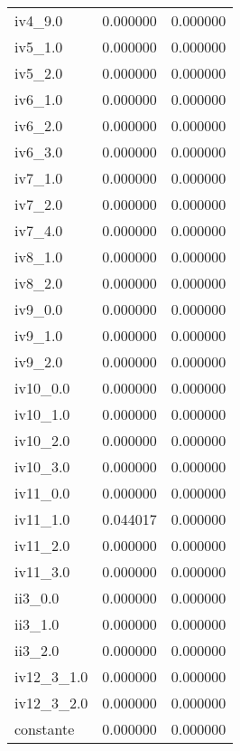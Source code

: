 \begin{tabular}{lrr}
iv4_9.0 & 0.000000 & 0.000000 \\
iv5_1.0 & 0.000000 & 0.000000 \\
iv5_2.0 & 0.000000 & 0.000000 \\
iv6_1.0 & 0.000000 & 0.000000 \\
iv6_2.0 & 0.000000 & 0.000000 \\
iv6_3.0 & 0.000000 & 0.000000 \\
iv7_1.0 & 0.000000 & 0.000000 \\
iv7_2.0 & 0.000000 & 0.000000 \\
iv7_4.0 & 0.000000 & 0.000000 \\
iv8_1.0 & 0.000000 & 0.000000 \\
iv8_2.0 & 0.000000 & 0.000000 \\
iv9_0.0 & 0.000000 & 0.000000 \\
iv9_1.0 & 0.000000 & 0.000000 \\
iv9_2.0 & 0.000000 & 0.000000 \\
iv10_0.0 & 0.000000 & 0.000000 \\
iv10_1.0 & 0.000000 & 0.000000 \\
iv10_2.0 & 0.000000 & 0.000000 \\
iv10_3.0 & 0.000000 & 0.000000 \\
iv11_0.0 & 0.000000 & 0.000000 \\
iv11_1.0 & 0.044017 & 0.000000 \\
iv11_2.0 & 0.000000 & 0.000000 \\
iv11_3.0 & 0.000000 & 0.000000 \\
ii3_0.0 & 0.000000 & 0.000000 \\
ii3_1.0 & 0.000000 & 0.000000 \\
ii3_2.0 & 0.000000 & 0.000000 \\
iv12_3_1.0 & 0.000000 & 0.000000 \\
iv12_3_2.0 & 0.000000 & 0.000000 \\
constante & 0.000000 & 0.000000 \\
\bottomrule
\end{tabular}
